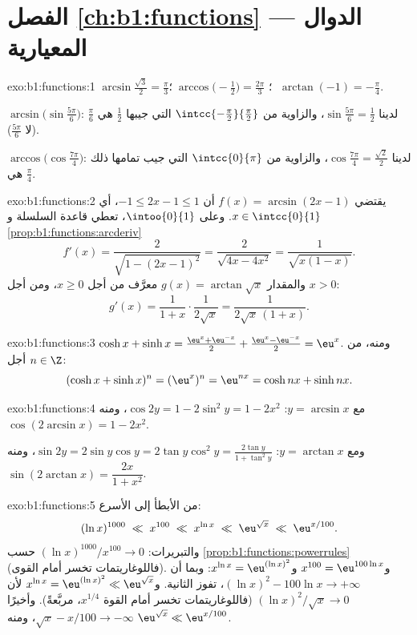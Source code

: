 \section*{الفصل \ref{ch:b1:functions} --- الدوال المعيارية}

\begin{solution}{exo:b1:functions:1}
$\arcsin\frac{\sqrt 3}{2} = \frac\pi3$؛
$\;\arccos\bigl(-\frac12\bigr) = \frac{2\pi}{3}$؛
$\;\arctan(-1) = -\frac\pi4$.

$\arcsin\bigl(\sin\frac{5\pi}{6}\bigr)$: لدينا $\sin\frac{5\pi}{6} =
\frac12$، والزاوية من $\intcc{-\frac\pi2}{\frac\pi2}$ التي جيبها
$\frac12$ هي $\frac\pi6$ (لا $\frac{5\pi}{6}$).

$\arccos\bigl(\cos\frac{7\pi}{4}\bigr)$: لدينا $\cos\frac{7\pi}{4} =
\frac{\sqrt 2}{2}$، والزاوية من $\intcc{0}{\pi}$ التي جيب تمامها ذلك
هي $\frac\pi4$.
\end{solution}

\begin{solution}{exo:b1:functions:2}
يقتضي $f(x) = \arcsin(2x - 1)$ أن $-1 \leq 2x - 1 \leq 1$، أي $x
\in \intcc{0}{1}$. وعلى $\intoo{0}{1}$، تعطي قاعدة السلسلة و
\cref{prop:b1:functions:arcderiv}
\[
f'(x) = \frac{2}{\sqrt{1 - (2x-1)^2}} = \frac{2}{\sqrt{4x - 4x^2}}
= \frac{1}{\sqrt{x(1 - x)}} .
\]
والمقدار $g(x) = \arctan\sqrt x$ معرَّف من أجل $x \geq 0$، ومن أجل $x > 0$:
\[
g'(x) = \frac{1}{1 + x} \cdot \frac{1}{2\sqrt x}
= \frac{1}{2\sqrt x\,(1 + x)} .
\]
\end{solution}

\begin{solution}{exo:b1:functions:3}
$\cosh x + \sinh x = \frac{\eu^x + \eu^{-x}}{2} + \frac{\eu^x -
\eu^{-x}}{2} = \eu^x$. ومنه، من أجل $n \in \Z$:
\[
(\cosh x + \sinh x)^n = (\eu^x)^n = \eu^{nx}
= \cosh nx + \sinh nx .
\]
\end{solution}

\begin{solution}{exo:b1:functions:4}
مع $y = \arcsin x$: $\cos 2y = 1 - 2\sin^2 y = 1 - 2x^2$، ومنه
$\cos(2\arcsin x) = 1 - 2x^2$.

ومع $y = \arctan x$: $\sin 2y = 2 \sin y \cos y = 2 \tan y \cos^2 y =
\frac{2\tan y}{1 + \tan^2 y}$، ومنه $\sin(2\arctan x) =
\dfrac{2x}{1 + x^2}$.
\end{solution}

\begin{solution}{exo:b1:functions:5}
من الأبطأ إلى الأسرع:
\[
(\ln x)^{1000} \;\ll\; x^{100} \;\ll\; x^{\ln x} \;\ll\;
\eu^{\sqrt x} \;\ll\; \eu^{x/100} .
\]
والتبريرات: $(\ln x)^{1000}/x^{100} \to 0$ حسب
\cref{prop:b1:functions:powerrules} (فاللوغاريتمات تخسر أمام القوى).
و$x^{100} = \eu^{100\ln x}$ و$x^{\ln x} = \eu^{(\ln x)^2}$: وبما أن
$(\ln x)^2 - 100\ln x \to +\infty$، تفوز الثانية. و$x^{\ln x} =
\eu^{(\ln x)^2} \ll \eu^{\sqrt x}$ لأن $(\ln x)^2/\sqrt x \to 0$
(فاللوغاريتمات تخسر أمام القوة $x^{1/4}$، مربَّعةً). وأخيرًا $\sqrt x - x/100
\to -\infty$، ومنه $\eu^{\sqrt x} \ll \eu^{x/100}$.
\end{solution}


